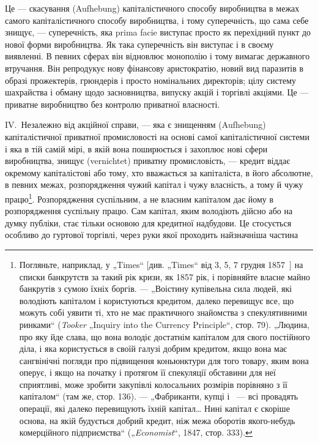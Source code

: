Це — скасування (Aufhebung) капіталістичного способу виробництва
в межах самого капіталістичного способу виробництва,
і тому суперечність, що сама себе знищує, — суперечність, яка
prima facie виступає просто як перехідний пункт до нової
форми виробництва. Як така суперечність він виступає і в
своєму виявленні. В певних сферах він відновлює монополію і
тому вимагає державного втручання. Він репродукує нову фінансову аристократію, новий вид паразитів в
образі прожектерів,
грюндерів і просто номінальних директорів; цілу систему шахрайства і обману щодо засновництва,
випуску акцій і торгівлі акціями.
Це — приватне виробництво без контролю приватної власності.

IV.~Незалежно від акційної справи, — яка є знищенням (Aufhebung) капіталістичної приватної
промисловості на основі самої
капіталістичної системи і яка в тій самій мірі, в якій вона поширюється і захоплює нові сфери
виробництва, знищує (vernichtet)
приватну промисловість, — кредит віддає окремому капіталістові
або тому, хто вважається за капіталіста, в його абсолютне, в
певних межах, розпорядження чужий капітал і чужу власність,
а тому й чужу працю\footnote{
Погляньте, наприклад, у „Times“ [див. „Times“ від 3, 5, 7 грудня 1857~]
на списки банкрутств за такий рік кризи, як 1857 рік, і порівняйте власне майно
банкрутів з сумою їхніх боргів. — „Воістину купівельна сила людей, які володіють
капіталом і користуються кредитом, далеко перевищує все, що можуть собі уявити
ті, хто не має практичного знайомства з спекулятивними ринками“ (\emph{Tooker}
„Inquiry into the Currency Principle“, стор. 79). „Людина, про яку йде слава, що
вона володіє достатнім капіталом для свого постійного діла, і яка користується в своїй галузі добрим
кредитом, якщо вона має сангвінічні погляди
про підвищення коньюнктури для того товару, яким вона оперує, і якщо на
початку і протягом її спекуляції обставини для неї сприятливі, може зробити
закупівлі колосальних розмірів порівняно з її капіталом“ (там же, стор. 136). —
 „Фабриканти, купці і~ — всі провадять операції, які далеко перевищують їхній
капітал\dots{} Нині капітал є скоріше основа, на якій будується добрий кредит,
ніж межа оборотів якого-небудь комерційного підприємства“ („\emph{Economist}“, 1847,
стор. 333).
}. Розпорядження суспільним, а не власним
капіталом дає йому в розпорядження суспільну працю. Сам капітал, яким володіють дійсно або на думку
публіки, стає тільки
основою для кредитної надбудови. Це стосується особливо до
гуртової торгівлі, через руки якої проходить найзначніша частина

